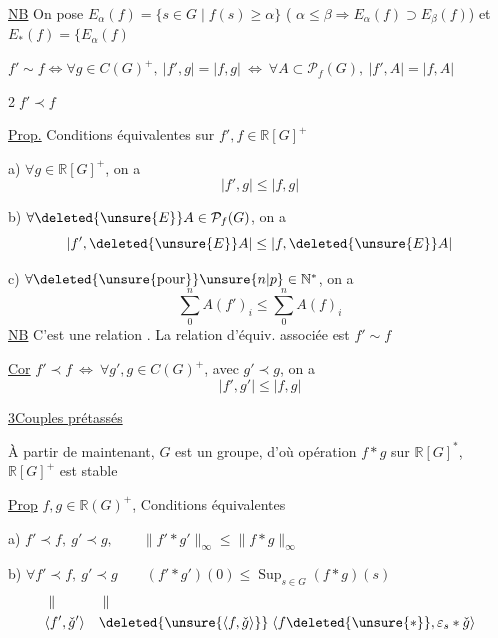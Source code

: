 \uline{NB} On pose $E_\alpha(f)=\{s\in G\mid f(s)\geq\alpha\}$ ( $\alpha\leq\beta\Rightarrow E_\alpha(f)\supset E_\beta(f)$) et $E_*(f)=\{E_\alpha(f)$

 $f'\sim f\Longleftrightarrow\forall g\in C(G)^+,\ |f',g|=|f,g|\ \Longleftrightarrow\ \forall A\subset\mathcal P_f(G),\ |f',A|=|f,A|$

\textcircled{2}\quad \uline{$f'\prec f$}

\uline{Prop.} Conditions équivalentes sur $f',f\in\mathbb R[G]^+$

a) $\forall g\in\mathbb R[G]^+$, on a
\[
 |f',g|\leq|f,g|
\]

b) $\forall\deleted{\unsure{E}}A\in\mathcal P_f(G)$, on a
\[
 |f',\deleted{\unsure{E}}A|\leq|f,\deleted{\unsure{E}}A|
\]

c) $\forall\deleted{\unsure{\text{pour}}}\unsure{n|p}\in\mathbb N^{*}$, on a
\[
 \sum_0^{n} A(f')_i\leq\sum_0^{n} A(f)_i
\]
\uline{NB} C'est une relation . La relation d'équiv. associée est $f'\sim f$



\uline{Cor} $f'\prec f\ \Longleftrightarrow\ \forall g',g\in C(G)^+$, avec $g'\prec g$, on a
\[
 |f',g'|\leq|f,g|
\]

\uline{3}\quad \uline{Couples prétassés}

À partir de maintenant, $G$ est un groupe, d'où opération $f*g$ sur $\mathbb R[G]^{*}$, $\mathbb R[G]^+$ est stable

\uline{Prop} $f,g\in\mathbb R(G)^+$, Conditions équivalentes


a) $f'\prec f,\ g'\prec g,\qquad \|f'*g'\|_\infty\leq\|f*g\|_\infty$

b) $\forall f'\prec f,\ g'\prec g\qquad (f'*g')(0)\leq\operatorname{Sup}_{s\in G}(f*g)(s)$
\[
 \begin{aligned}
 &\parallel &&\parallel\\
 &\langle f',\check g'\rangle &&\deleted{\unsure{\langle f,\check g\rangle}}\;\langle f\deleted{\unsure{*}},\varepsilon_s*\check g\rangle
 \end{aligned}
\]

